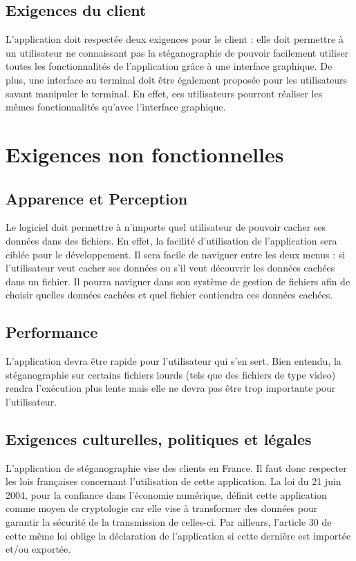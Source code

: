\documentclass[11pt]{article}
\begin{document}
\subsection{Exigences du client}
L'application doit respectée deux exigences pour le client : elle doit permettre à un utilisateur ne connaissant pas la stéganographie de pouvoir facilement utiliser toutes les fonctionnalités de 
l'application grâce à une interface graphique. De plus, une interface au terminal doit être également proposée pour les utilisateurs savant manipuler le terminal. En effet, ces utilisateurs pourront réaliser les mêmes fonctionnalités qu'avec l'interface graphique. 

\section{Exigences non fonctionnelles}
\subsection{Apparence et Perception}
Le logiciel doit permettre à n'importe quel utilisateur de pouvoir cacher ses données dans des fichiers. En effet, la facilité d'utilisation de l'application sera ciblée pour le développement. 
Il sera facile de naviguer entre les deux menus : si l'utilisateur veut cacher ses données ou s'il veut découvrir les données cachées dans un fichier. 
Il pourra naviguer dans son système de gestion de fichiers afin de choisir quelles données cachées et quel fichier contiendra ces données cachées. 

\subsection{Performance}
L'application devra être rapide pour l'utilisateur qui s'en sert. Bien entendu, la stéganographie sur certains fichiers lourds (tels que des fichiers de type video) rendra l'exécution plus lente 
mais elle ne devra pas être trop importante pour l'utilisateur. 

\subsection{Exigences culturelles, politiques et légales}
L'application de stéganographie vise des clients en France. Il faut donc respecter les lois françaises concernant l'utilisation de cette application. 
La loi du 21 juin 2004, pour la confiance dans l'économie numérique, définit cette application comme moyen de cryptologie car elle vise à transformer des données pour garantir la sécurité de la transmission de celles-ci. 
Par ailleurs, l'article 30 de cette même loi oblige la déclaration de l'application si cette dernière est importée et/ou exportée. 
\end{document}
